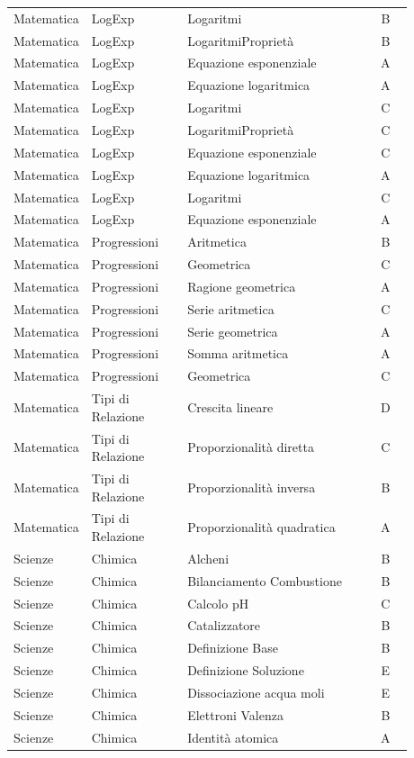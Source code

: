 \documentclass[20pt, a4paper]{article}
\begin{document}
\begin{longtable}{@{}>{\raggedright\arraybackslash}p{0.18\linewidth}>{\raggedright\arraybackslash}p{0.24\linewidth}>{\raggedright\arraybackslash}p{0.46\linewidth}c@{}}
Matematica & LogExp & Logaritmi & B \\
Matematica & LogExp & LogaritmiProprietà & B \\
Matematica & LogExp & Equazione esponenziale & A \\
Matematica & LogExp & Equazione logaritmica & A \\
Matematica & LogExp & Logaritmi & C \\
Matematica & LogExp & LogaritmiProprietà & C \\
Matematica & LogExp & Equazione esponenziale & C \\
Matematica & LogExp & Equazione logaritmica & A \\
Matematica & LogExp & Logaritmi & C \\
Matematica & LogExp & Equazione esponenziale & A \\
Matematica & Progressioni & Aritmetica & B \\
Matematica & Progressioni & Geometrica & C \\
Matematica & Progressioni & Ragione geometrica & A \\
Matematica & Progressioni & Serie aritmetica & C \\
Matematica & Progressioni & Serie geometrica & A \\
Matematica & Progressioni & Somma aritmetica & A \\
Matematica & Progressioni & Geometrica & C \\
Matematica & Tipi di Relazione & Crescita lineare & D \\
Matematica & Tipi di Relazione & Proporzionalità diretta & C \\
Matematica & Tipi di Relazione & Proporzionalità inversa & B \\
Matematica & Tipi di Relazione & Proporzionalità quadratica & A \\
Scienze & Chimica & Alcheni & B \\
Scienze & Chimica & Bilanciamento Combustione & B \\
Scienze & Chimica & Calcolo pH & C \\
Scienze & Chimica & Catalizzatore & B \\
Scienze & Chimica & Definizione Base & B \\
Scienze & Chimica & Definizione Soluzione & E \\
Scienze & Chimica & Dissociazione acqua moli & E \\
Scienze & Chimica & Elettroni Valenza & B \\
Scienze & Chimica & Identità atomica & A \\

\end{longtable}
\end{document}
